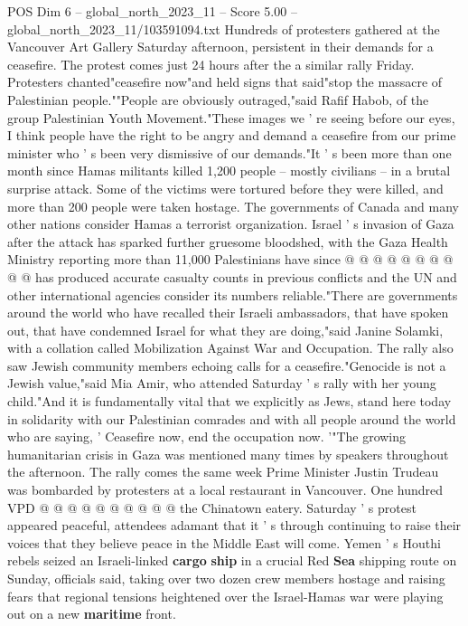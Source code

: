 \begin{textsample}{POS Dim 6 – global\_north\_2023\_11 – Score 5.00 – global\_north\_2023\_11/103591094.txt}  \label{ex:f6_pos_216}
Hundreds of protesters gathered at the Vancouver Art Gallery Saturday afternoon, persistent in their demands for a ceasefire.
The protest comes just 24 hours after the a similar rally Friday.
Protesters chanted"ceasefire now"and held signs that said"stop the massacre of Palestinian people.""People are obviously outraged,"said Rafif Habob, of the group Palestinian Youth Movement."These images we ' re seeing before our eyes, I think people have the right to be angry and demand a ceasefire from our prime minister who ' s been very dismissive of our demands."It ' s been more than one month since Hamas militants killed 1,200 people -- mostly civilians -- in a brutal surprise attack.
Some of the victims were tortured before they were killed, and more than 200 people were taken hostage.
The governments of Canada and many other nations consider Hamas a terrorist organization.
Israel ' s invasion of Gaza after the attack has sparked further gruesome bloodshed, with the Gaza Health Ministry reporting more than 11,000 Palestinians have since @ @ @ @ @ @ @ @ @ @ has produced accurate casualty counts in previous conflicts and the UN and other international agencies consider its numbers reliable."There are governments around the world who have recalled their Israeli ambassadors, that have spoken out, that have condemned Israel for what they are doing,"said Janine Solamki, with a collation called Mobilization Against War and Occupation.
The rally also saw Jewish community members echoing calls for a ceasefire."Genocide is not a Jewish value,"said Mia Amir, who attended Saturday ' s rally with her young child."And it is fundamentally vital that we explicitly as Jews, stand here today in solidarity with our Palestinian comrades and with all people around the world who are saying, ' Ceasefire now, end the occupation now. '"The growing humanitarian crisis in Gaza was mentioned many times by speakers throughout the afternoon.
The rally comes the same week Prime Minister Justin Trudeau was bombarded by protesters at a local restaurant in Vancouver.
One hundred VPD @ @ @ @ @ @ @ @ @ @ the Chinatown eatery.
Saturday ' s protest appeared peaceful, attendees adamant that it ' s through continuing to raise their voices that they believe peace in the Middle East will come.
Yemen ' s Houthi rebels seized an Israeli-linked \textbf{cargo} \textbf{ship} in a crucial Red \textbf{Sea} shipping route on Sunday, officials said, taking over two dozen crew members hostage and raising fears that regional tensions heightened over the Israel-Hamas war were playing out on a new \textbf{maritime} front.

\end{textsample}
